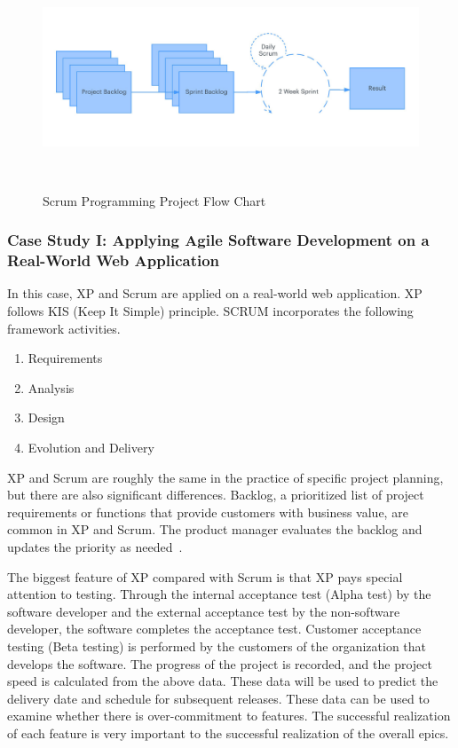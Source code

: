 \documentclass{sigchi}
\begin{document}
\begin{figure}
\centering
  \includegraphics[width=0.9\columnwidth]{figures/scrum}
  \caption{Scrum Programming Project Flow Chart }~\label{fig:figure1}
\end{figure}



\subsubsection{Case Study I: Applying Agile Software Development on a Real-World Web Application}

In this case, XP and Scrum are applied on a real-world web application. XP follows KIS (Keep It Simple) principle. SCRUM incorporates the following framework activities.

\begin{itemize}
\begin{enumerate}
\item Requirements
\item Analysis
\item Design
\item Evolution and Delivery
\end{enumerate}
\end{itemize}

XP and Scrum are roughly the same in the practice of specific project planning, but there are also significant differences. Backlog, a prioritized list of project requirements or functions that provide customers with business value, are common in XP and Scrum. The product manager evaluates the backlog and updates the priority as needed~\cite{boehm_software_2001,kumar_agile_2012}.

The biggest feature of XP compared with Scrum is that XP pays special attention to testing. Through the internal acceptance test (Alpha test) by the software developer and the external acceptance test by the non-software developer, the software completes the acceptance test. Customer acceptance testing (Beta testing) is performed by the customers of the organization that develops the software. The progress of the project is recorded, and the project speed is calculated from the above data. These data will be used to predict the delivery date and schedule for subsequent releases. These data can be used to examine whether there is over-commitment to features. The successful realization of each feature is very important to the successful realization of the overall epics.
\end{document}
